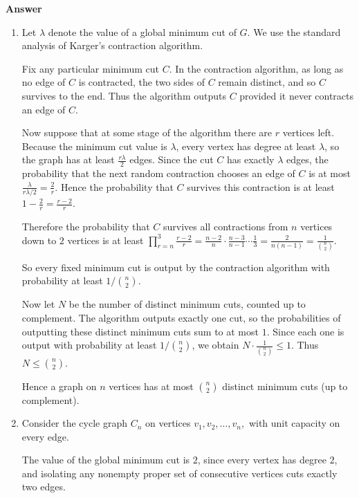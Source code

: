 \documentclass[letterpaper]{article}
\begin{document}
	
	\textbf{Answer}
	
	\begin{enumerate}
		\item[(a)] Let $\lambda$ denote the value of a global minimum cut of $G$.
		We use the standard analysis of Karger's contraction algorithm.
		
		Fix any particular minimum cut $C$. In the contraction algorithm, as long as
		no edge of $C$ is contracted, the two sides of $C$ remain distinct, and so
		$C$ survives to the end. Thus the algorithm outputs $C$ provided it never
		contracts an edge of $C$.
		
		Now suppose that at some stage of the algorithm there are $r$ vertices left.
		Because the minimum cut value is $\lambda$, every vertex has degree at least
		$\lambda$, so the graph has at least
		$
		\frac{r\lambda}{2}
		$
		edges. Since the cut $C$ has exactly $\lambda$ edges, the probability that the
		next random contraction chooses an edge of $C$ is at most
		$
		\frac{\lambda}{r\lambda/2} = \frac{2}{r}.
		$
		Hence the probability that $C$ survives this contraction is at least
		$
		1-\frac{2}{r}=\frac{r-2}{r}.
		$
		
		Therefore the probability that $C$ survives all contractions from $n$ vertices
		down to $2$ vertices is at least
		$
		\prod_{r= n}^{3}\frac{r-2}{r}
		=
		\frac{n-2}{n}\cdot\frac{n-3}{n-1}\cdots\frac{1}{3}
		=
		\frac{2}{n(n-1)}
		=
		\frac{1}{\binom{n}{2}}.
		$
		
		So every fixed minimum cut is output by the contraction algorithm with
		probability at least $1/\binom{n}{2}$.
		
		Now let $N$ be the number of distinct minimum cuts, counted up to complement.
		The algorithm outputs exactly one cut, so the probabilities of outputting
		these distinct minimum cuts sum to at most $1$. Since each one is output with
		probability at least $1/\binom{n}{2}$, we obtain
		$
		N \cdot \frac{1}{\binom{n}{2}} \le 1.
		$
		Thus
		$
		N \le \binom{n}{2}.
		$
		
		Hence a graph on $n$ vertices has at most $\binom{n}{2}$ distinct minimum cuts
		(up to complement).
		
		\medskip
		
		\item[(b)] Consider the cycle graph $C_n$ on vertices
		$
		v_1,v_2,\ldots,v_n,
		$
		with unit capacity on every edge.
		
		The value of the global minimum cut is $2$, since every vertex has degree $2$,
		and isolating any nonempty proper set of consecutive vertices cuts exactly two
		edges.
		

\end{enumerate}
\end{document}
